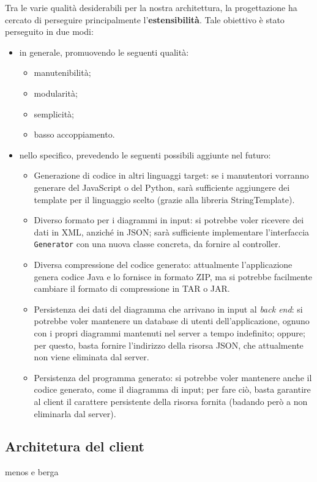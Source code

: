 Tra le varie qualità desiderabili per la nostra architettura, la progettazione ha cercato di perseguire principalmente l'\textbf{estensibilità}. Tale obiettivo è stato perseguito in due modi:
\begin{itemize}
	\item in generale, promuovendo le seguenti qualità:
	\begin{itemize}
		\item manutenibilità;
		\item modularità;
		\item semplicità;
		\item basso accoppiamento.
	\end{itemize}
	\item nello specifico, prevedendo le seguenti possibili aggiunte nel futuro:
	\begin{itemize}
		\item Generazione di codice in altri linguaggi target: se i manutentori vorranno generare del JavaScript o del Python, sarà sufficiente aggiungere dei template per il linguaggio scelto (grazie alla libreria StringTemplate).
		\item Diverso formato per i diagrammi in input: si potrebbe voler ricevere dei dati in XML, anziché in JSON; sarà sufficiente implementare l'interfaccia \texttt{Generator} con una nuova classe concreta, da fornire al controller.
		\item Diversa compressione del codice generato: attualmente l'applicazione genera codice Java e lo fornisce in formato ZIP, ma si potrebbe facilmente cambiare il formato di compressione in TAR o JAR.
		\item Persistenza dei dati del diagramma che arrivano in input al \emph{back end}: si potrebbe voler mantenere un database di utenti dell'applicazione, ognuno con i propri diagrammi mantenuti nel server a tempo indefinito; oppure; per questo, basta fornire l'indirizzo della risorsa JSON, che attualmente non viene eliminata dal server. %
		\item Persistenza del programma generato: si potrebbe voler mantenere anche il codice generato, come il diagramma di input; per fare ciò, basta garantire al client il carattere persistente della risorsa fornita (badando però a non eliminarla dal server). %
	\end{itemize}
\end{itemize}



\subsection{Architetura del client} \label{sec:arch_client}
menos e berga



